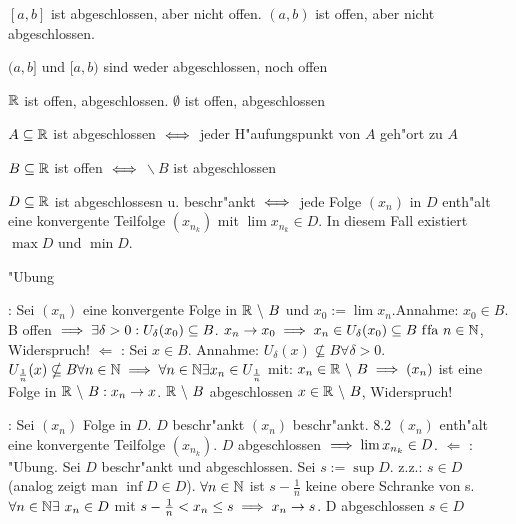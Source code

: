 \documentclass[a4paper,twoside,DIV15,BCOR12mm]{scrbook}
\begin{document}
\begin{beispiele}
\item $[a, b]$ ist abgeschlossen, aber nicht offen. $(a, b)$ ist offen, aber nicht abgeschlossen.
\item $(a, b]$ und $[a, b)$ sind weder abgeschlossen, noch offen
\item $\mathbb{R}$ ist offen, abgeschlossen. $\emptyset$ ist offen, abgeschlossen
\end{beispiele}


\begin{hilfssatz*}
\begin{liste}
\item $A \subseteq \mathbb{R}$ ist abgeschlossen $\iff$ jeder H"aufungspunkt von $A$ geh"ort zu $A$
\item $B \subseteq \mathbb{R}$ ist offen $\iff$ \MdR$ \backslash\ B$ ist abgeschlossen
\item $D \subseteq \mathbb{R}$ ist abgeschlossesn u. beschr"ankt $\iff$ jede Folge $(x_n)$ in $D$ enth"alt eine konvergente Teilfolge $(x_{n_k})$ mit $\lim x_{n_k} \in D$. In diesem Fall existiert $\max D$ und $\min D$.
\end{liste}
\end{hilfssatz*}

\begin{beweis}
\begin{liste}
\item "Ubung
\item \glqq \folgt \grqq: Sei $(x_n)$ eine konvergente Folge in $\MdR\ \backslash\ B$ und $x_0:=\lim x_n$.Annahme: $x_0 \in B$. B offen $\implies \exists \delta>0 : U_\delta(x_0) \subseteq B$. $x_n \to x_0 \implies x_n \in U_\delta(x_0) \subseteq B \text{ f\/fa } n \in\mathbb{N}$, Widerspruch! \glqq $\Leftarrow$ \grqq: Sei $x \in B$. Annahme: $U_\delta(x) \nsubseteq B \forall \delta>0$. 
\folgt $U_{\frac{1}{n}}(x) \nsubseteq B \forall n \in \mathbb{N} 
\implies \forall n \in \mathbb{N} \exists x_n \in U_{\frac{1}{n}}$ mit: $x_n \in \mathbb{R}\ \backslash\ B \implies (x_n)$ ist eine Folge in $\MdR\ \backslash\ B: x_n \to x$. $\MdR\ \backslash\ B$ abgeschlossen \folgt $x \in \mathbb{R}\ \backslash\ B$, Widerspruch!
\item \glqq \folgt \grqq: Sei $(x_n)$ Folge in $D$. $D$ beschr"ankt \folgt $(x_n)$ beschr"ankt. 8.2 \folgt $(x_n)$ enth"alt eine konvergente Teilfolge $(x_{n_k})$. $D$ abgeschlossen $\implies \lim x_{n_k} \in D$. \glqq $\Leftarrow$ \grqq: "Ubung. Sei $D$ beschr"ankt und abgeschlossen. Sei $s:=\sup D$. z.z.: $s \in D$ (analog zeigt man $\inf D \in D$). $\forall n \in \mathbb{N}$ ist $s-\frac{1}{n}$ keine obere Schranke von s. \folgt $\forall n \in\mathbb{N}\exists\ x_n \in D$ mit $s - \frac{1}{n} < x_n \le s \implies x_n \to s$. D abgeschlossen \folgt $s \in D$
\end{liste}
\end{beweis}
\end{document}
